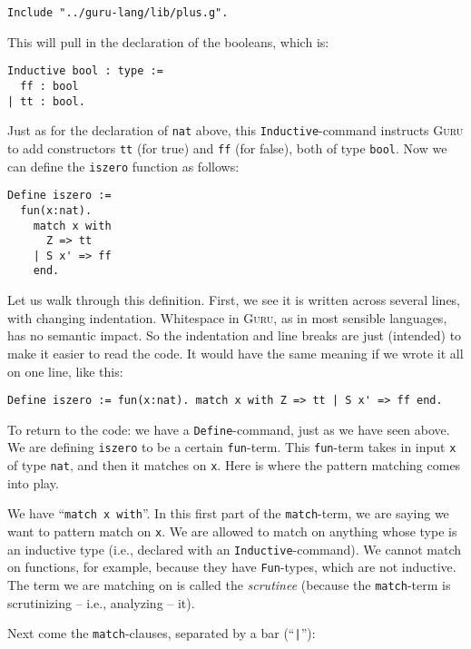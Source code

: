 \documentclass{book}[12pt]
\newcommand{\guru}[0]{\textsc{Guru}\xspace}
\begin{document}
\begin{verbatim}
Include "../guru-lang/lib/plus.g".
\end{verbatim}

\noindent This will pull in the declaration of the booleans, which is:

\begin{verbatim}
Inductive bool : type :=
  ff : bool
| tt : bool.
\end{verbatim}

\noindent Just as for the declaration of \texttt{nat} above, this
\texttt{Inductive}-command instructs \guru to add constructors
\texttt{tt} (for true) and \texttt{ff} (for false), both of type
\texttt{bool}.  Now we can define the \texttt{iszero} function as
follows:

\begin{verbatim}
Define iszero := 
  fun(x:nat). 
    match x with 
      Z => tt 
    | S x' => ff
    end.
\end{verbatim}

\noindent Let us walk through this definition.  First, we see it is
written across several lines, with changing indentation.  Whitespace
in \guru, as in most sensible languages, has no semantic impact.  So
the indentation and line breaks are just (intended) to make it easier
to read the code.  It would have the same meaning if we wrote it all
on one line, like this:

\begin{verbatim}
Define iszero := fun(x:nat). match x with Z => tt | S x' => ff end.
\end{verbatim}

\noindent To return to the code: we have a \texttt{Define}-command,
just as we have seen above.  We are defining \texttt{iszero} to be a
certain \texttt{fun}-term.  This \texttt{fun}-term takes in input
\texttt{x} of type \texttt{nat}, and then it matches on \texttt{x}.
Here is where the pattern matching comes into play.  

We have ``\texttt{match x with}''.  In this first part of the
\texttt{match}-term, we are saying we want to pattern match on
\texttt{x}.  We are allowed to match on anything whose type is an
inductive type (i.e., declared with an \texttt{Inductive}-command).
We cannot match on functions, for example, because they have
\texttt{Fun}-types, which are not inductive.  The term we are matching
on is called the \emph{scrutinee} (because the \texttt{match}-term is
scrutinizing -- i.e., analyzing -- it).  

Next come the \texttt{match}-clauses, separated by a bar (``\texttt{|}''):
\end{document}
